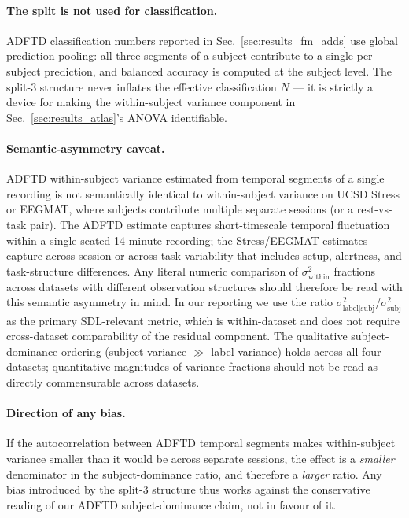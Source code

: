 \paragraph{The split is not used for classification.} ADFTD
classification numbers reported in Sec.~\ref{sec:results_fm_adds}
use global prediction pooling: all three segments of a subject
contribute to a single per-subject prediction, and balanced accuracy
is computed at the subject level. The split-3 structure never
inflates the effective classification $N$ --- it is strictly a
device for making the within-subject variance component in
Sec.~\ref{sec:results_atlas}'s ANOVA identifiable.

\paragraph{Semantic-asymmetry caveat.} ADFTD within-subject variance
estimated from temporal segments of a single recording is not
semantically identical to within-subject variance on UCSD Stress or
EEGMAT, where subjects contribute multiple separate sessions (or a
rest-vs-task pair). The ADFTD estimate captures short-timescale
temporal fluctuation within a single seated 14-minute recording;
the Stress/EEGMAT estimates capture across-session or across-task
variability that includes setup, alertness, and task-structure
differences. Any literal numeric comparison of
$\sigma^2_\text{within}$ fractions across datasets with different
observation structures should therefore be read with this semantic
asymmetry in mind. In our reporting we use the ratio
$\sigma^2_\text{label|subj} / \sigma^2_\text{subj}$ as the primary
SDL-relevant metric, which is within-dataset and does not require
cross-dataset comparability of the residual component. The
qualitative subject-dominance ordering (subject variance
$\gg$ label variance) holds across all four datasets;
quantitative magnitudes of variance fractions should not be read as
directly commensurable across datasets.

\paragraph{Direction of any bias.} If the autocorrelation between
ADFTD temporal segments makes within-subject variance smaller than
it would be across separate sessions, the effect is a \emph{smaller}
denominator in the subject-dominance ratio, and therefore a
\emph{larger} ratio. Any bias introduced by the split-3 structure
thus works against the conservative reading of our ADFTD
subject-dominance claim, not in favour of it.
